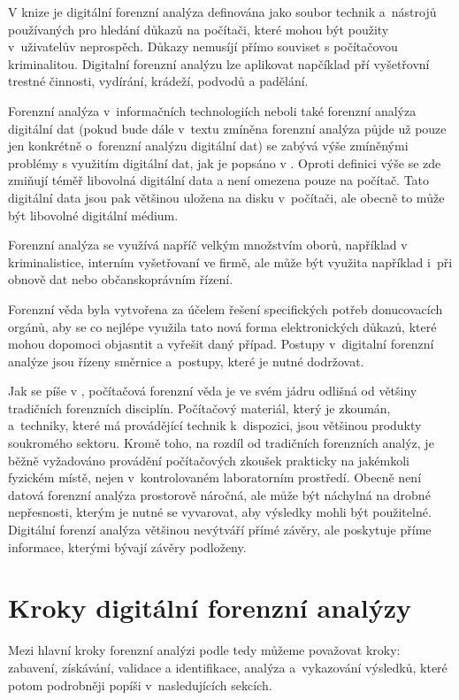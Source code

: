 \documentclass[thesis=B,czech]{FITthesis}[2012/06/26]
\begin{document}
V knize \cite{RECHAndBook} je digitální forenzní analýza definována jako soubor technik a~nástrojů používaných pro hledání důkazů na počítači, které mohou být použity v~uživatelův neprospěch. Důkazy nemusíjí přímo souviset s počítačovou kriminalitou. Digitalní forenzní analýzu lze aplikovat napčíklad pří vyšetřovní trestné činnosti, vydírání, krádeží, podvodů a padělání.

Forenzní analýza v~informačních technologiích neboli také forenzní analýza digitální dat (pokud bude dále v~textu zmíněna forenzní analýza půjde už pouze jen konkrétně o~forenzní analýzu digitální dat) se zabývá výše zmíněnými problémy s využitím digitální dat, jak je popsáno v \cite{for_root}. Oproti definici výše se zde zmiňují téměř libovolná digitální data a není omezena pouze na počítač. Tato digitální data jsou pak většinou uložena na disku v~počítači, ale obecně to může být libovolné digitální médium.

Forenzní analýza se využívá napříč velkým množstvím oborů, například v kriminalistice, interním vyšetřovaní ve firmě, ale může být využita například i~při obnově dat nebo občanskoprávním řízení.

Forenzní věda byla vytvořena za účelem řešení specifických potřeb donucovacích orgánů, aby se co nejlépe využila tato nová forma elektronických důkazů, které mohou dopomoci objasntit a vyřešit daný případ. Postupy v~digitalní forenzní analýze jsou řízeny směrnice a~postupy, které je nutné dodržovat.

Jak se píše v \cite{for_uvod}, počítačová forenzní věda je ve svém jádru odlišná od většiny tradičních forenzních disciplín. Počítačový materiál, který je zkoumán, a~techniky, které má provádějící technik k~dispozici, jsou většinou produkty soukromého sektoru. Kromě toho, na rozdíl od tradičních forenzních analýz, je běžně vyžadováno provádění počítačových zkoušek prakticky na jakémkoli fyzickém místě, nejen v~kontrolovaném laboratorním prostředí. Obecně není datová forenzní analýza prostorově náročná, ale může být náchylná na drobné nepřesnosti, kterým je nutné se vyvarovat, aby výsledky mohli být použitelné. Digitální forenzí analýza většinou nevýtváří přímé závěry, ale poskytuje příme informace, kterými bývají závěry podloženy.


\section{Kroky digitální forenzní analýzy}
Mezi hlavní kroky forenzní analýzi podle \cite{carroll2008computer} tedy můžeme považovat kroky: zabavení, získávání, validace a identifikace, analýza a~vykazování výsledků, které potom podrobněji popíši v~nasledujících sekcích.
\end{document}
